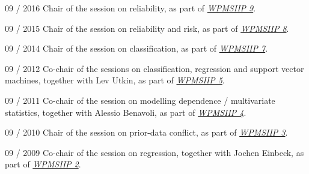 \documentclass[a4paper]{simplecv}
\begin{document}
\begin{topic}
\item[09 / 2016] Chair of the session on reliability,
                 as part of \emph{\href{http://www.maths.dur.ac.uk/users/matthias.troffaes/wpmsiip2016/index.html}{WPMSIIP 9}}.

\item[09 / 2015] Chair of the session on reliability and risk,
                 as part of \emph{\href{http://www.statistik.lmu.de/wpmsiip_2015/}{WPMSIIP 8}}.

\item[09 / 2014] Chair of the session on classification,
                 as part of \emph{\href{http://users.ugent.be/~slopatat/wpmsiip2014/index.html}{WPMSIIP 7}}.

\item[09 / 2012] Co-chair of the sessions on classification, regression and support vector machines, together with Lev Utkin,
                 as part of \emph{\href{http://www.statistik.lmu.de/institut/ag/statsoz_neu/research/WPMSIIP_2012/}{WPMSIIP 5}}.

\item[09 / 2011] Co-chair of the session on modelling dependence / multivariate statistics, together with Alessio Benavoli,
                 as part of \emph{\href{http://wpmsiip2011.fdvinfo.net/c/646/Information/}{WPMSIIP 4}}.

\item[09 / 2010] Chair of the session on prior-data conflict,
                 as part of \emph{\href{http://www.maths.dur.ac.uk/users/matthias.troffaes/wpmsiip2010/}{WPMSIIP 3}}.

\item[09 / 2009] Co-chair of the session on regression, together with Jochen Einbeck,
                 as part of \emph{\href{http://www.stat.uni-muenchen.de/~walter/workshop0909/}{WPMSIIP 2}}.


\end{topic}
\end{document}
